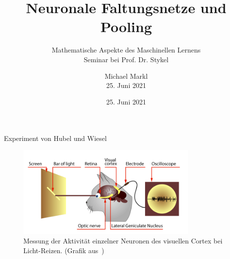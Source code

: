 \documentclass[envcountsect, smaller, aspectratio=149]{beamer}
\title{Neuronale Faltungsnetze und Pooling}
\author{Michael Markl\\25. Juni 2021}
\date{25. Juni 2021}
\subtitle{Mathematische Aspekte des Maschinellen Lernens\\
Seminar bei Prof. Dr. Stykel}
\begin{document}
\maketitle

\begin{frame}{Experiment von Hubel und Wiesel~\cite{Hubel1959, Hubel1962}}
    
\begin{figure}
    \vspace*{-2em}
    \includegraphics[width=0.8\textwidth]{cat-experiment.png}
    \vspace{-1em}
    \caption{Messung der Aktivität einzelner Neuronen des visuellen Cortex bei Licht-Reizen. {\scriptsize(Grafik aus~\cite{Ver17})}}
\end{figure}

\end{frame}
\end{document}
